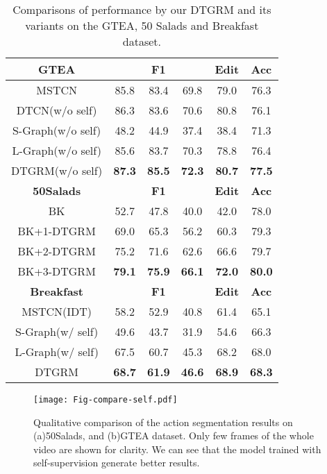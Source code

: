 \documentclass[letterpaper]{article} \usepackage{aaai21}  \usepackage{times}  \usepackage{helvet} \usepackage{courier}  \usepackage[hyphens]{url}  \usepackage{graphicx} \usepackage{mathtools}
\begin{document}
\begin{table}[htbp]
	\centering
	\caption{Comparisons of performance by our DTGRM and its variants on the GTEA, 50 Salads and Breakfast dataset.}
	\vspace{-0.2cm}
	\begin{tabular}{cccccc}
		\hline
		\textbf{GTEA} &\multicolumn{3}{c}{\textbf{F1}} &\textbf{Edit} &\textbf{Acc} \\ 
		\hline
		MSTCN &85.8 &83.4 &69.8 &79.0 &76.3 \\
		DTCN(w/o self) &86.3 &83.6 &70.6 &80.8 &76.1 \\
		S-Graph(w/o self) &48.2 &44.9 &37.4 &38.4 &71.3 \\
		L-Graph(w/o self) &85.6 &83.7 &70.3 &78.8 &76.4 \\
		\hline
		DTGRM(w/o self) &\textbf{87.3} &\textbf{85.5} &\textbf{72.3} &\textbf{80.7} &\textbf{77.5} \\
		\hline
		\hline
		\textbf{50Salads} &\multicolumn{3}{c}{\textbf{F1}} &\textbf{Edit} &\textbf{Acc} \\ 
		\hline
		BK &52.7 &47.8 &40.0 &42.0 &78.0 \\
		BK+1-DTGRM &69.0 &65.3 &56.2 &60.3 &79.3 \\
		BK+2-DTGRM &75.2 &71.6 &62.6 &66.6 &79.7 \\
		BK+3-DTGRM &\textbf{79.1} &\textbf{75.9} &\textbf{66.1} &\textbf{72.0} &\textbf{80.0} \\
		\hline
		\hline
		\textbf{Breakfast} &\multicolumn{3}{c}{\textbf{F1}} &\textbf{Edit} &\textbf{Acc} \\ 
		\hline
		MSTCN(IDT) &58.2 &52.9 &40.8 &61.4 &65.1 \\
		S-Graph(w/ self) &49.6 &43.7 &31.9 &54.6 &66.3 \\
		L-Graph(w/ self) &67.5 &60.7 &45.3 &68.2 &68.0 \\
		\hline
        DTGRM &\textbf{68.7} &\textbf{61.9} &\textbf{46.6} &\textbf{68.9} &\textbf{68.3} \\
        \hline
	\end{tabular}\label{Table-DTGRM}
\end{table}

\begin{figure*}
	\begin{center}
		\texttt{[image: Fig-compare-self.pdf]}
	\end{center}
	\vspace{-0.2cm}
	\caption{Qualitative comparison of the action segmentation results on (a)50Salads, and (b)GTEA dataset. Only few frames of the whole video are shown for clarity. We can see that the model trained with self-supervision generate better results.}
	\label{Fig-compare-self}
\end{figure*}
\end{document}
